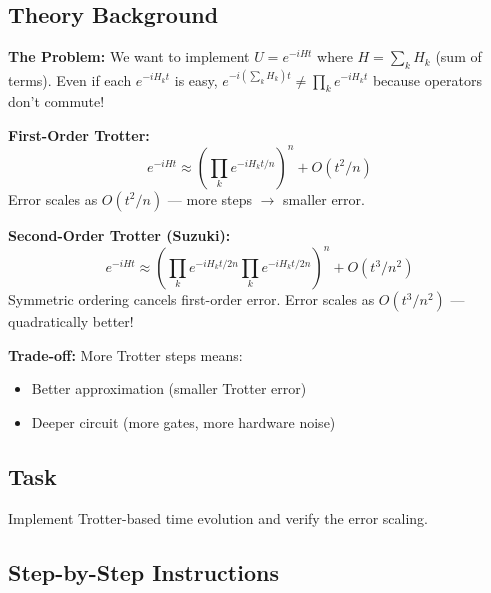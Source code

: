 \documentclass[11pt,a4paper]{article}
\begin{document}
\subsection*{Theory Background}
\textbf{The Problem:} We want to implement $U = e^{-iHt}$ where $H = \sum_k H_k$ (sum of terms). Even if each $e^{-iH_k t}$ is easy, $e^{-i(\sum_k H_k)t} \neq \prod_k e^{-iH_k t}$ because operators don't commute!

\textbf{First-Order Trotter:}
\[
e^{-iHt} \approx \left( \prod_k e^{-iH_k t/n} \right)^n + O(t^2/n)
\]
Error scales as $O(t^2/n)$ --- more steps $\to$ smaller error.

\textbf{Second-Order Trotter (Suzuki):}
\[
e^{-iHt} \approx \left( \prod_k e^{-iH_k t/2n} \prod_k e^{-iH_k t/2n} \right)^n + O(t^3/n^2)
\]
Symmetric ordering cancels first-order error. Error scales as $O(t^3/n^2)$ --- quadratically better!

\textbf{Trade-off:} More Trotter steps means:
\begin{itemize}
    \item Better approximation (smaller Trotter error)
    \item Deeper circuit (more gates, more hardware noise)
\end{itemize}

\subsection*{Task}
Implement Trotter-based time evolution and verify the error scaling.

\subsection*{Step-by-Step Instructions}
\end{document}
